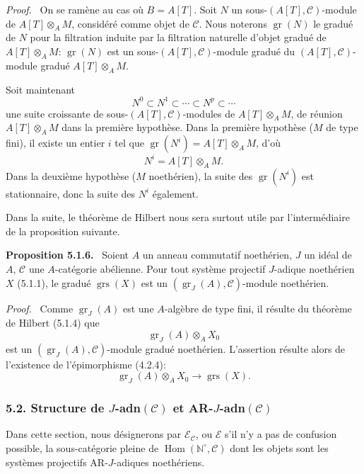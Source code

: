 \documentclass[11pt]{article}
\newenvironment{statement}[1]{\par\medskip\noindent\textbf{#1.}\ }{\par\medskip}
\newenvironment{prooftext}[1][Proof]{\par\noindent\emph{#1.}\ }{\par\medskip}
\DeclareMathOperator{\Hom}{Hom}
\providecommand{\gr}{\operatorname{gr}}
\providecommand{\Hom}{\operatorname{Hom}}
\providecommand{\gr}{\operatorname{gr}}
\providecommand{\gr}{\operatorname{gr}}
\providecommand{\grs}{\operatorname{grs}}
\providecommand{\Hom}{\operatorname{Hom}}
\begin{document}
\begin{prooftext}
On se ramène au cas où \(B=A[T]\). Soit \(N\) un sous-\((A[T],\mathcal C)\)-module de \(A[T]\otimes_A M\), considéré comme objet de \(\mathcal C\). Nous noterons \(\gr(N)\) le gradué de \(N\) pour la filtration induite par la filtration naturelle d'objet gradué de \(A[T]\otimes_A M\): \(\gr(N)\) est un sous-\((A[T],\mathcal C)\)-module gradué du \((A[T],\mathcal C)\)-module gradué \(A[T]\otimes_A M\).

Soit maintenant
\[
N^0\subset N^1\subset\cdots\subset N^p\subset\cdots
\]
une suite croissante de sous-\((A[T],\mathcal C)\)-modules de \(A[T]\otimes_A M\), de réunion \(A[T]\otimes_A M\) dans la première hypothèse. Dans la première hypothèse (\(M\) de type fini), il existe un entier \(i\) tel que \(\gr(N^i)=A[T]\otimes_A M\), d'où
\[
N^i=A[T]\otimes_A M.
\]
Dans la deuxième hypothèse (\(M\) noethérien), la suite des \(\gr(N^i)\) est stationnaire, donc la suite des \(N^i\) également.

Dans la suite, le théorème de Hilbert nous sera surtout utile par l'intermédiaire de la proposition suivante.
\end{prooftext}

\begin{statement}{Proposition 5.1.6}
Soient \(A\) un anneau commutatif noethérien, \(J\) un idéal de \(A\), \(\mathcal C\) une \(A\)-catégorie abélienne. Pour tout système projectif \(J\)-adique noethérien \(X\) (5.1.1), le gradué \(\grs(X)\) est un \((\gr_J(A),\mathcal C)\)-module noethérien.
\end{statement}

\begin{prooftext}
Comme \(\gr_J(A)\) est une \(A\)-algèbre de type fini, il résulte du théorème de Hilbert (5.1.4) que
\[
\gr_J(A)\otimes_A X_0
\]
est un \((\gr_J(A),\mathcal C)\)-module gradué noethérien. L'assertion résulte alors de l'existence de l'épimorphisme (4.2.4):
\[
\gr_J(A)\otimes_A X_0\longrightarrow \grs(X).
\]
\end{prooftext}

\subsubsection*{5.2. Structure de \(J\)-adn\((\mathcal C)\) et AR-\(J\)-adn\((\mathcal C)\)}

Dans cette section, nous désignerons par \(\mathcal E_{\mathcal C}\), ou \(\mathcal E\) s'il n'y a pas de confusion possible, la sous-catégorie pleine de \(\Hom(\mathbb N^\circ,\mathcal C)\) dont les objets sont les systèmes projectifs AR-\(J\)-adiques noethériens.
\end{document}
